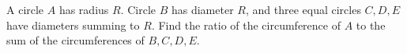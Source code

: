 A circle $A$ has radius $R$. Circle $B$ has diameter $R$, and three equal circles $C,D,E$ have diameters summing to $R$. Find the ratio of the circumference of $A$ to the sum of the circumferences of $B,C,D,E$.
